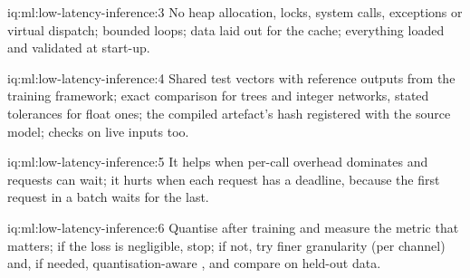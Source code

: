 \begin{solution}{iq:ml:low-latency-inference:3}
No heap allocation, locks, system calls, exceptions or virtual dispatch; bounded loops; data laid out for the cache; everything
loaded and validated at start-up.
\end{solution}

\begin{solution}{iq:ml:low-latency-inference:4}
Shared test vectors with reference outputs from the training framework; exact comparison for trees and integer networks, stated
tolerances for float ones; the compiled artefact's hash registered with the source model; checks on live inputs too.
\end{solution}

\begin{solution}{iq:ml:low-latency-inference:5}
It helps when per-call overhead dominates and requests can wait; it hurts when each request has a deadline, because the first
request in a batch waits for the last.
\end{solution}

\begin{solution}{iq:ml:low-latency-inference:6}
Quantise after training and measure the metric that matters; if the loss is negligible, stop; if not, try finer granularity
(per channel) and, if needed, quantisation-aware , and compare on held-out data.
\end{solution}
